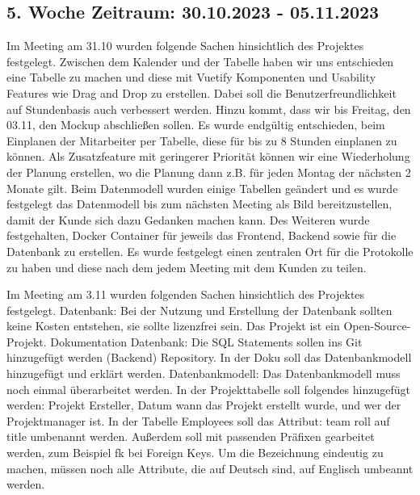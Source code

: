 \documentclass{article}
\begin{document}
\subsection{5. Woche Zeitraum: 30.10.2023 - 05.11.2023}
Im Meeting am 31.10 wurden folgende Sachen hinsichtlich des Projektes
festgelegt. Zwischen dem Kalender und der Tabelle haben wir uns entschieden
eine Tabelle zu machen und diese mit Vuetify Komponenten und Usability Features
wie Drag and Drop zu erstellen. Dabei soll die Benutzerfreundlichkeit auf
Stundenbasis auch verbessert werden. Hinzu kommt, dass wir bis Freitag, den
03.11, den Mockup abschließen sollen. Es wurde endgültig entschieden, beim
Einplanen der Mitarbeiter per Tabelle, diese für bis zu 8 Stunden einplanen zu
können. Als Zusatzfeature mit geringerer Priorität können wir eine Wiederholung
der Planung erstellen, wo die Planung dann z.B. für jeden Montag der nächsten 2
Monate gilt. Beim Datenmodell wurden einige Tabellen geändert und es wurde
festgelegt das Datenmodell bis zum nächsten Meeting als Bild bereitzustellen,
damit der Kunde sich dazu Gedanken machen kann. Des Weiteren wurde
festgehalten, Docker Container für jeweils das Frontend, Backend sowie für die
Datenbank zu erstellen. Es wurde festgelegt einen zentralen Ort für die
Protokolle zu haben und diese nach dem jedem Meeting mit dem Kunden zu teilen.

Im Meeting am 3.11 wurden folgenden Sachen hinsichtlich des Projektes
festgelegt. Datenbank: Bei der Nutzung und Erstellung der Datenbank sollten
keine Kosten entstehen, sie sollte lizenzfrei sein. Das Projekt ist ein
Open-Source-Projekt. Dokumentation Datenbank: Die SQL Statements sollen ins Git
hinzugefügt werden (Backend) Repository. In der Doku soll das Datenbankmodell
hinzugefügt und erklärt werden. Datenbankmodell: Das Datenbankmodell muss noch
einmal überarbeitet werden. In der Projekttabelle soll folgendes hinzugefügt
werden: Projekt Ersteller, Datum wann das Projekt erstellt wurde, und wer der
Projektmanager ist. In der Tabelle Employees soll das Attribut: team roll auf
title umbenannt werden. Außerdem soll mit passenden Präfixen gearbeitet werden,
zum Beispiel fk bei Foreign Keys. Um die Bezeichnung eindeutig zu machen,
müssen noch alle Attribute, die auf Deutsch sind, auf Englisch umbeannt werden.
\end{document}
